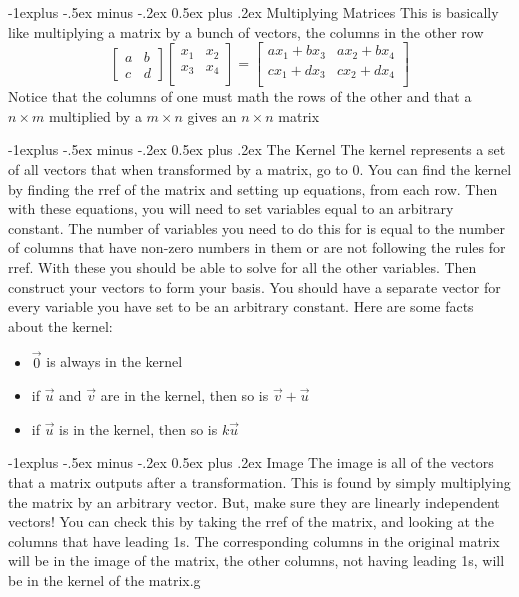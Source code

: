 \documentclass[10pt,landscape]{article}
\makeatletter
\renewcommand{\subsection}{\@startsection{subsection}{2}{0mm}%
                                {-1explus -.5ex minus -.2ex}%
                                {0.5ex plus .2ex}%
                                {\normalfont\normalsize\bfseries}}
\makeatother
\begin{document}
\begin{multicols}{3}
\subsection{Multiplying Matrices}
This is basically like multiplying a matrix by a bunch of vectors, the columns in the other row
\begin{equation*}
    \begin{bmatrix}
    a&b\\
    c&d
    \end{bmatrix}
    \begin{bmatrix}{}
    x_1&x_2\\
    x_3&x_4\\
    \end{bmatrix}
    =
    \begin{bmatrix}{}
    ax_1+bx_3&ax_2+bx_4\\
    cx_1+dx_3&cx_2+dx_4\\
    \end{bmatrix}
\end{equation*}{}
Notice that the columns of one must math the rows of the other and that a $n\times m$ multiplied by a $m\times n$ gives an $n\times n$ matrix

\subsection{The Kernel}
The kernel represents a set of all vectors that when transformed by a matrix, go to 0. You can find the kernel by finding the rref of the matrix and setting up equations, from each row. Then with these equations, you will need to set variables equal to an arbitrary constant. The number of variables you need to do this for is equal to the number of columns that have non-zero numbers in them or are not following the rules for rref. With these you should be able to solve for all the other variables. Then construct your vectors to form your basis. You should have a separate vector for every variable you have set to be an arbitrary constant. Here are some facts about the kernel:
\begin{itemize}
    \item $\vec{0}$ is always in the kernel
    \item if $\vec{u}$ and $\vec{v}$ are in the kernel, then so is $\vec{v}+\vec{u}$
    \item if $\vec{u}$ is in the kernel, then so is $k\vec{u}$
\end{itemize}{}
\subsection{Image}
The image is all of the vectors that a matrix outputs after a transformation. This is found by simply multiplying the matrix by an arbitrary vector.  But, make sure they are linearly independent vectors! You can check this by taking the rref of the matrix, and looking at the columns that have leading 1s. The corresponding columns in the original matrix will be in the image of the matrix, the other columns, not having leading 1s, will be in the kernel of the matrix.g


\end{multicols}
\end{document}
